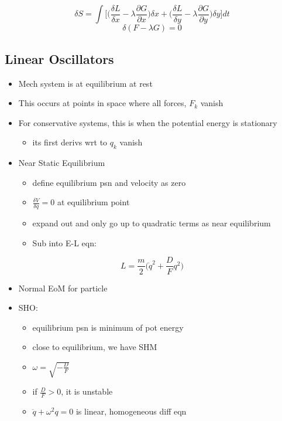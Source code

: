 \documentclass[a4paper,11pt,normalem]{article}
\begin{document}
\[
    \delta S = \int \Bigg[\Big(\frac{\delta L}{\delta x} - \lambda\frac{\partial G}{\partial x} \Big)\delta x + \Big(\frac{\delta L}{\delta y} - \lambda\frac{\partial G}{\partial y} \Big)\delta y \Bigg]dt \]
\[
    \delta(F - \lambda G) = 0
\]

\subsection{Linear Oscillators}\label{linear-oscillators}

\begin{itemize}
\item
  Mech system is at equilibrium at rest
\item
  This occurs at points in space where all forces, \(F_k\) vanish
\item
  For conservative systems, this is when the potential energy is
  stationary
  \begin{itemize}
  \item
    its first derivs wrt to \(q_k\) vanish
  \end{itemize}
\item
  Near Static Equilibrium
  \begin{itemize}
  \item
    define equilibrium psn and velocity as zero
  \item
    \(\frac{\delta V}{\delta q} = 0\) at equilibrium point
  \item
    expand out and only go up to quadratic terms as near equilibrium
  \item
    Sub into E-L eqn:
  \end{itemize}
\end{itemize}

\[
    L = \frac{m}{2}\Big(\dot{q}^2 + \frac{D}{F}q^2 \Big)
\]

\begin{itemize}
\item
  Normal EoM for particle
\item
  SHO:
  \begin{itemize}
  \item
    equilibrium psn is minimum of pot energy
  \item
    close to equilibrium, we have SHM
  \item
    \(\omega = \sqrt{-\frac{D}{F}}\)
  \item
    if \(\frac{D}{F} > 0\), it is unstable
  \item
    \(\ddot{q} + \omega^2 q = 0\) is linear, homogeneous diff eqn
  \end{itemize}
\end{itemize}
\end{document}
